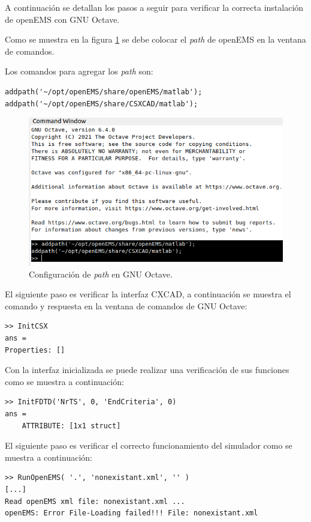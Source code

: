 \documentclass[
    11pt,
    spanish,
	a4paper
]{article}
\begin{document}
A continuación se detallan los pasos a seguir para verificar la correcta
instalación de openEMS con GNU Octave.

Como se muestra en la figura \ref{fig:octavepath} se debe colocar el \emph{path}
de openEMS en la ventana de comandos.

Los comandos para agregar los \emph{path} son:

\begin{verbatim}
addpath('~/opt/openEMS/share/openEMS/matlab');
addpath('~/opt/openEMS/share/CSXCAD/matlab');
\end{verbatim}

\begin{figure}[htbp]
	\centering
	\includegraphics[width=\textwidth]{./img/octavepath.png}
	\caption{Configuración de \emph{path} en GNU Octave.}
	\label{fig:octavepath}
\end{figure}

El siguiente paso es verificar la interfaz CXCAD, a continuación se muestra el
comando y respuesta en la ventana de comandos de GNU Octave:

\begin{verbatim}
>> InitCSX
ans = 
Properties: []
\end{verbatim}

Con la interfaz inicializada se puede realizar una verificación de sus funciones
como se muestra a continuación:

\begin{verbatim}
>> InitFDTD('NrTS', 0, 'EndCriteria', 0)
ans = 
    ATTRIBUTE: [1x1 struct]
\end{verbatim}

El siguiente paso es verificar el correcto funcionamiento del simulador como se
muestra a continuación:

\begin{verbatim}
>> RunOpenEMS( '.', 'nonexistant.xml', '' )
[...]
Read openEMS xml file: nonexistant.xml ...
openEMS: Error File-Loading failed!!! File: nonexistant.xml
\end{verbatim}
\end{document}
